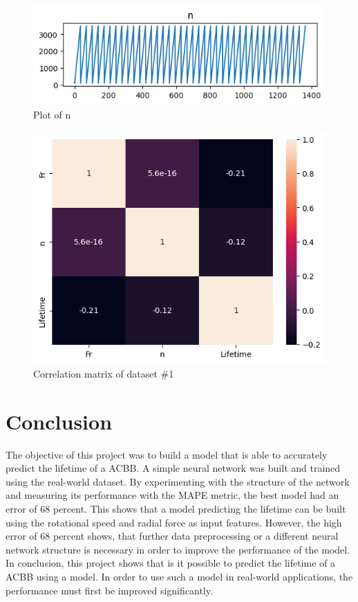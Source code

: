 \documentclass[letterpaper,10pt]{article}
\begin{document}
	\begin{figure}
		\caption{Plot of n}
		\centering
		\includegraphics[scale=0.65]{assets/dataset1_column_n_plot.png}
	\end{figure}
	\begin{figure}
		\caption{Correlation matrix of dataset \#1}
		\centering
		\includegraphics[scale=0.5]{assets/dataset1_correlation_matrix.png}
	\end{figure}
	
	\newpage
	\section{Conclusion}
	The objective of this project was to build a model that is able to accurately predict the lifetime of a ACBB. A simple neural network was built and trained using the real-world dataset. By experimenting with the structure of the network and measuring its performance with the MAPE metric, the best model had an error of 68 percent. This shows that a model predicting the lifetime can be built using the rotational speed and radial force as input features. However, the high error of 68 percent shows, that further data preprocessing or a different neural network structure is necessary in order to improve the performance of the model. In conclusion, this project shows that is it possible to predict the lifetime of a ACBB using a model. In order to use such a model in real-world applications, the performance must first be improved significantly.

	\newpage
	 
	
	
\end{document}
